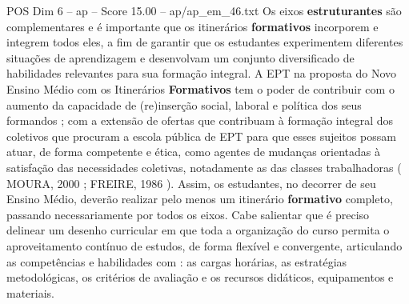 \begin{textsample}{POS Dim 6 – ap – Score 15.00 – ap/ap\_em\_46.txt}
Os eixos \textbf{estruturantes} são complementares e é importante que os itinerários \textbf{formativos} incorporem e integrem todos eles, a fim de garantir que os estudantes experimentem diferentes situações de aprendizagem e desenvolvam um conjunto diversificado de habilidades relevantes para sua formação integral.
A EPT na proposta do Novo Ensino Médio com os Itinerários \textbf{Formativos} tem o poder de contribuir com o aumento da capacidade de (re)inserção social, laboral e política dos seus formandos ; com a extensão de ofertas que contribuam à formação integral dos coletivos que procuram a escola pública de EPT para que esses sujeitos possam atuar, de forma competente e ética, como agentes de mudanças orientadas à satisfação das necessidades coletivas, notadamente as das classes trabalhadoras ( MOURA, 2000 ; FREIRE, 1986 ).
Assim, os estudantes, no decorrer de seu Ensino Médio, deverão realizar pelo menos um itinerário \textbf{formativo} completo, passando necessariamente por todos os eixos.
Cabe salientar que é preciso delinear um desenho curricular em que toda a organização do curso permita o aproveitamento contínuo de estudos, de forma flexível e convergente, articulando as competências e habilidades com : as cargas horárias, as estratégias metodológicas, os critérios de avaliação e os recursos didáticos, equipamentos e materiais.

\end{textsample}
